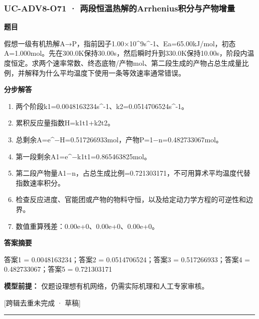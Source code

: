 \documentclass[UTF8,11pt,a4paper]{ctexart}
\begin{document}
\subsubsection*{UC-ADV8-O71 · 两段恒温热解的Arrhenius积分与产物增量}
\noindent\textbf{题目}\par
假想一级有机热解A→P，指前因子1.00×10\textasciicircum{}9s\textasciicircum{}-1、Ea=65.00kJ/mol，初态A=1.000mol。先在300.0K保持30.00s，然后瞬时升到330.0K保持10.00s，阶段内温度恒定。求两个速率常数、终态底物/产物mol、第二段生成的产物占总生成量比例，并解释为什么平均温度下使用一条等效速率通常错误。\par
\medskip\noindent\textbf{分步解答}
\begin{enumerate}
\item 两个阶段k1=0.0048163234s\textasciicircum{}-1、k2=0.0514706524s\textasciicircum{}-1。
\item 累积反应量指数H=k1t1+k2t2。
\item 总剩余A=e\textasciicircum{}−H=0.517266933mol，产物P=1−n=0.482733067mol。
\item 第一段剩余A1=e\textasciicircum{}−k1t1=0.865463825mol。
\item 第二段产物量A1−n，占总生成比例=0.721303171，不可用算术平均温度代替指数速率积分。
\item 检查反应进度、官能团或产物的物料守恒，以及给定动力学方程的可逆性和边界。
\item 数值重算残差：0.00e+0、0.00e+0、0.00e+0。
\end{enumerate}
\noindent\textbf{答案摘要}\par
答案1 = 0.0048163234；答案2 = 0.0514706524；答案3 = 0.517266933；答案4 = 0.482733067；答案5 = 0.721303171\par
\noindent\textbf{模型前提：}
仅题设理想有机网络，仍需实际机理和人工专家审核。\par
\noindent\textcolor{red!65!black}{[跨辑去重未完成 · 草稿]} \par
\medskip\hrule\medskip
{}
\end{document}
